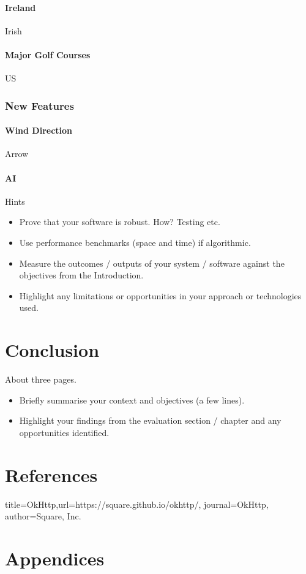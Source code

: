 \subsubsection{Ireland}
Irish
\subsubsection{Major Golf Courses}
US
\subsection{New Features}
\subsubsection{Wind Direction}
Arrow
\subsubsection{AI}
Hints
\begin{itemize}
\item Prove that your software is robust. How? Testing etc.
\item Use performance benchmarks (space and time) if algorithmic.
\item Measure the outcomes / outputs of your system / software against the objectives from the Introduction.
\item Highlight any limitations or opportunities in your approach or technologies used.
\end{itemize}
\chapter{Conclusion}
About three pages.
\begin{itemize}
\item Briefly summarise your context and objectives (a few lines).
\item Highlight your findings from the evaluation section / chapter and any opportunities identified.
\end{itemize}
\chapter{References}

\begin{thebibliography}{9}
 {title={OkHttp},url={https://square.github.io/okhttp/}, journal={OkHttp}, author={Square, Inc.}}

\end{thebibliography}
\chapter{Appendices}